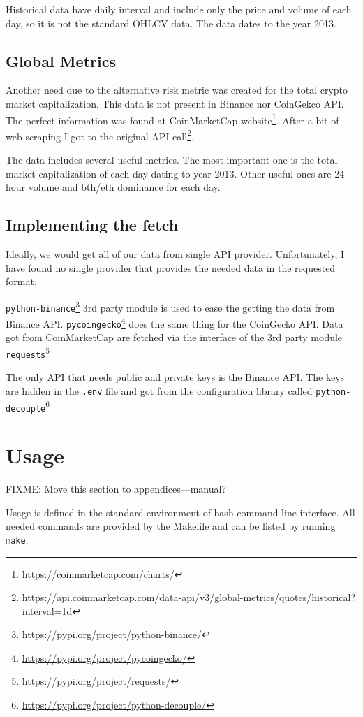 Historical data have daily interval and include only the price and volume of each day, so it is not the standard OHLCV data. The data dates to the year 2013.

\subsection*{Global Metrics}
Another need due to the alternative risk metric was created for the total crypto market capitalization. This data is not present in Binance nor CoinGekco API. The perfect information was found at CoinMarketCap website\footnote{\url{https://coinmarketcap.com/charts/}}. After a bit of web scraping I got to the original API call\footnote{\url{https://api.coinmarketcap.com/data-api/v3/global-metrics/quotes/historical?interval=1d}}.

The data includes several useful metrics. The most important one is the total market capitalization of each day dating to year 2013. Other useful ones are 24 hour volume and bth/eth dominance for each day.

\subsection*{Implementing the fetch}
Ideally, we would get all of our data from single API provider. Unfortunately, I have found no single provider that provides the needed data in the requested format.

\texttt{python-binance}\footnote{\url{https://pypi.org/project/python-binance/}} 3rd party module is used to ease the getting the data from Binance API. \texttt{pycoingecko}\footnote{\url{https://pypi.org/project/pycoingecko/}} does the same thing for the CoinGecko API. Data got from CoinMarketCap are fetched via the interface of the 3rd party module \texttt{requests}\footnote{\url{https://pypi.org/project/requests/}}

The only API that needs public and private keys is the Binance API. The keys are hidden in the \texttt{.env} file and got from the configuration library called \texttt{python-decouple}\footnote{\url{https://pypi.org/project/python-decouple/}}

\section{Usage}
FIXME: Move this section to appendices---manual?

Usage is defined in the standard environment of bash command line interface. All needed commands are provided by the Makefile and can be listed by running \texttt{make}.

